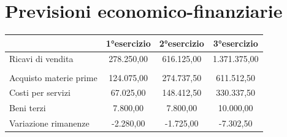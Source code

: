 \documentclass[12pt, a4paper]{article}
\begin{document}
\section{Previsioni economico-finanziarie}
\begin{tabular}{|lccc|}
    \hline
    \rowcolor[HTML]{CBCEFB}
    \multicolumn{1}{|l|}{\cellcolor[HTML]{CBCEFB}}                                                                                   & \multicolumn{1}{c|}{\cellcolor[HTML]{CBCEFB}\textbf{1°esercizio}} & \multicolumn{1}{c|}{\cellcolor[HTML]{CBCEFB}\textbf{2°esercizio}} & \textbf{3°esercizio} \\ \hline
    \multicolumn{1}{|l|}{Ricavi di vendita}                                                                                          & \multicolumn{1}{c|}{278.250,00}                                   & \multicolumn{1}{c|}{616.125,00}                                   & 1.371.375,00         \\ \hline
    \multicolumn{4}{|l|}{}                                                                                                                                                                                                                                                                          \\ \hline
    \multicolumn{1}{|l|}{Acquisto materie prime}                                                                                     & \multicolumn{1}{c|}{124.075,00}                                   & \multicolumn{1}{c|}{274.737,50}                                   & 611.512,50           \\ \hline
    \multicolumn{1}{|l|}{Costi per servizi}                                                                                          & \multicolumn{1}{c|}{67.025,00}                                    & \multicolumn{1}{c|}{148.412,50}                                   & 330.337,50           \\ \hline
    \multicolumn{1}{|l|}{Beni terzi}                                                                                                 & \multicolumn{1}{c|}{7.800,00}                                     & \multicolumn{1}{c|}{7.800,00}                                     & 10.000,00            \\ \hline
    \multicolumn{1}{|l|}{Variazione rimanenze}                                                                                       & \multicolumn{1}{c|}{-2.280,00}                                    & \multicolumn{1}{c|}{-1.725,00}                                    & -7.302,50            \\ \hline

\end{tabular}
\end{document}
